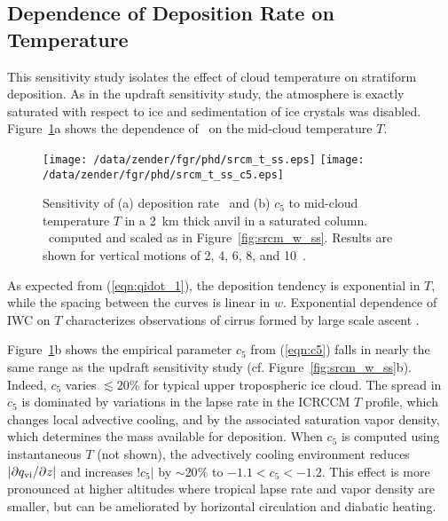 \documentclass[twoside,agums]{aguplus}
\begin{document}

\subsection{Dependence of Deposition Rate on Temperature}

This sensitivity study isolates the effect of cloud temperature on
stratiform deposition.
As in the updraft sensitivity study, the atmosphere is exactly
saturated with respect to ice and sedimentation of ice crystals was
disabled.
Figure~\ref{fig:srcm_t_ss}a shows the dependence of \IWPdot\ on the
mid-cloud temperature $T$.
\begin{figure}
\begin{center}
\texttt{[image: /data/zender/fgr/phd/srcm\_t\_ss.eps]}\vfill
\texttt{[image: /data/zender/fgr/phd/srcm\_t\_ss\_c5.eps]}\vfill
\end{center}
\caption[Sensitivity of deposition rate \IWPdot\ and $c_5$ to
mid-cloud temperature $T$ in a 2~km thick anvil in a saturated
column]{ 
Sensitivity of (a) deposition rate \IWPdot\ and (b) $c_5$ to mid-cloud
temperature $T$ in a 2~km thick anvil in a saturated column.  
\IWPdot\ computed and scaled as in Figure~\ref{fig:srcm_w_ss}.
Results are shown for vertical motions of 2, 4, 6, 8, and
10~\cmxs.\label{fig:srcm_t_ss}} 
\end{figure}
As expected from (\ref{eqn:qidot_1}), the deposition tendency is
exponential in $T$, while the spacing between the curves is linear in 
$w$. 
Exponential dependence of IWC on $T$ characterizes observations of
cirrus formed by large scale ascent \cite[]{Hey77}.

Figure~\ref{fig:srcm_t_ss}b shows the empirical parameter $c_5$ from 
(\ref{eqn:c5}) falls in nearly the same range as the updraft
sensitivity study (cf. Figure~\ref{fig:srcm_w_ss}b).
Indeed, $c_5$ varies $\lesssim 20\%$ for typical upper tropospheric
ice cloud.
The spread in $c_5$ is dominated by variations in the lapse rate in
the ICRCCM $T$ profile, which changes local advective cooling, and by
the associated saturation vapor density, which determines the mass
available for deposition. 
When $c_5$ is computed using instantaneous $T$ (not shown),
the advectively cooling environment reduces $|\mbox{$\partial \mbox{$q_\mathrm{vi}$} / \partial z$}|$ and increases
$!c_5|$ by $\sim 20\%$ to $-1.1 < c_5 < -1.2$.
This effect is more pronounced at higher altitudes where tropical
lapse rate and vapor density are smaller, but can be
ameliorated by horizontal circulation and diabatic heating. 
\end{document}

